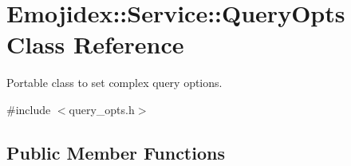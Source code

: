 \hypertarget{classEmojidex_1_1Service_1_1QueryOpts}{}\section{Emojidex\+:\+:Service\+:\+:Query\+Opts Class Reference}
\label{classEmojidex_1_1Service_1_1QueryOpts}


Portable class to set complex query options.  




{\ttfamily \#include $<$query\+\_\+opts.\+h$>$}

\subsection*{Public Member Functions}
